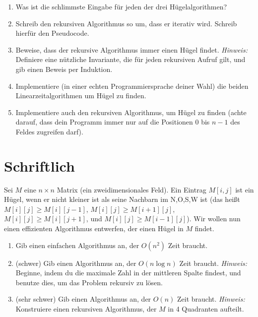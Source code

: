 \documentclass{uebung_cs}
\begin{document}
\begin{aufgabe}\label{thu-last}\mbox{}
	\begin{enumerate}
		\item Was ist die schlimmste Eingabe für jeden der drei Hügelalgorithmen?
		\item Schreib den rekursiven Algorithmus so um, dass er iterativ wird. Schreib hierfür den Pseudocode.
		\item Beweise, dass der rekursive Algorithmus immer einen Hügel findet. \emph{Hinweis:} Definiere eine nützliche Invariante, die für jeden rekursiven Aufruf gilt, und gib einen Beweis per Induktion.
		\item Implementiere (in einer echten Programmiersprache deiner Wahl) die beiden Linearzeitalgorithmen um Hügel zu finden.
		\item Implementiere auch den rekursiven Algorithmus, um Hügel zu finden (achte darauf, dass dein Programm immer nur auf die Positionen $0$ bis $n-1$ des Feldes zugreifen darf).
	\end{enumerate}
\end{aufgabe}

\section*{Schriftlich}
\begin{aufgabe}\label{star}
	Sei $M$ eine $n\times n$ Matrix (ein zweidimensionales Feld).
	Ein Eintrag $M[i,j]$ ist ein Hügel, wenn er nicht kleiner ist als seine Nachbarn im N,O,S,W ist (das heißt $M[i][j]\ge M[i][j-1]$, $M[i][j]\ge M[i+1][j]$, $M[i][j]\ge M[i][j+1]$, und $M[i][j]\ge M[i-1][j]$).
	Wir wollen nun einen effizienten Algorithmus entwerfen, der einen Hügel in $M$ findet.
	\begin{enumerate}
		\item Gib einen einfachen Algorithmus an, der $O(n^2)$ Zeit braucht.
		\item (schwer) Gib einen Algorithmus an, der $O(n \log n)$ Zeit braucht. \emph{Hinweis:} Beginne, indem du die maximale Zahl in der mittleren Spalte findest, und benutze dies, um das Problem rekursiv zu lösen.
		\item (sehr schwer) Gib einen Algorithmus an, der $O(n)$ Zeit braucht. \emph{Hinweis:} Konstruiere einen rekursiven Algorithmus, der $M$ in 4 Quadranten aufteilt.
	\end{enumerate}
\end{aufgabe}
\end{document}
